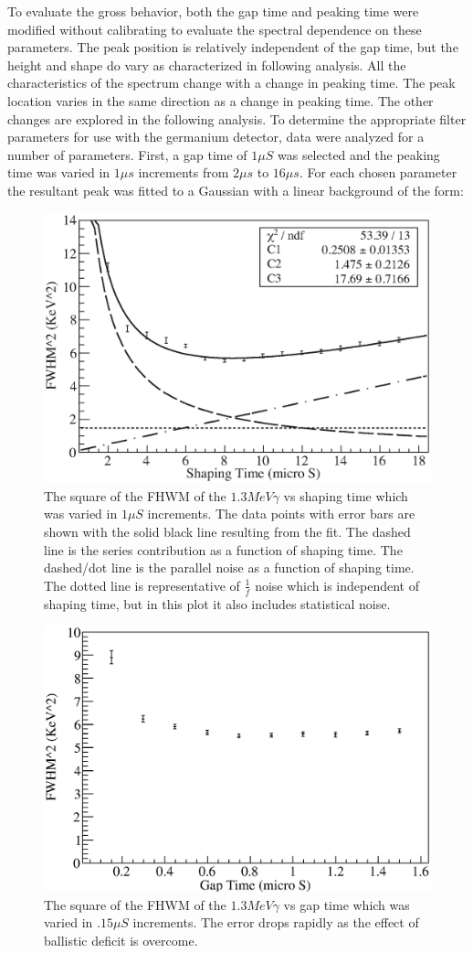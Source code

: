 \documentclass[twocolumn,preprintnumbers,superscriptaddress,amsmath,amssymb,floatfix]{revtex4-1}
\begin{document}
To evaluate the gross behavior, both the gap time and peaking time were modified without calibrating to evaluate the spectral dependence on these parameters. The peak position is relatively independent of the gap time, but the height and shape do vary as characterized in following analysis. All the characteristics of the spectrum change with a change in peaking time. The peak location varies in the same direction as a change in peaking time. The other changes are explored in the following analysis. To determine the appropriate filter parameters for use with the germanium detector, data were analyzed for a number of parameters. First, a gap time of $1\mu S$ was selected and the peaking time was varied in $1\mu s$ increments from $2\mu s$ to $16\mu s$. For each chosen parameter the resultant peak was fitted to a Gaussian with a linear background of the form:
\begin{figure}[b]
\includegraphics[width=.5\textwidth]{noise_v_shaping_time.eps}
\caption{The square of the FHWM of the $1.3 MeV \gamma$ vs shaping time which was varied in $1 \mu S$ increments. The data points with error bars are shown with the solid black line resulting from the fit. The dashed line is the series contribution as a function of shaping time. The dashed/dot line is the parallel noise as a function of shaping time. The dotted line is representative of $\frac{1}{f}$ noise which is independent of shaping time, but in this plot it also includes statistical noise.  
\label{shapemin}}
\end{figure}
\begin{figure}
\includegraphics[width=.5\textwidth]{gap_min.eps}
\caption{The square of the FHWM of the $1.3 MeV\gamma$ vs gap time which was varied in $.15 \mu S$ increments. The error drops rapidly as the effect of ballistic deficit is overcome.  
\label{gap_min}}
\end{figure}
\end{document}
